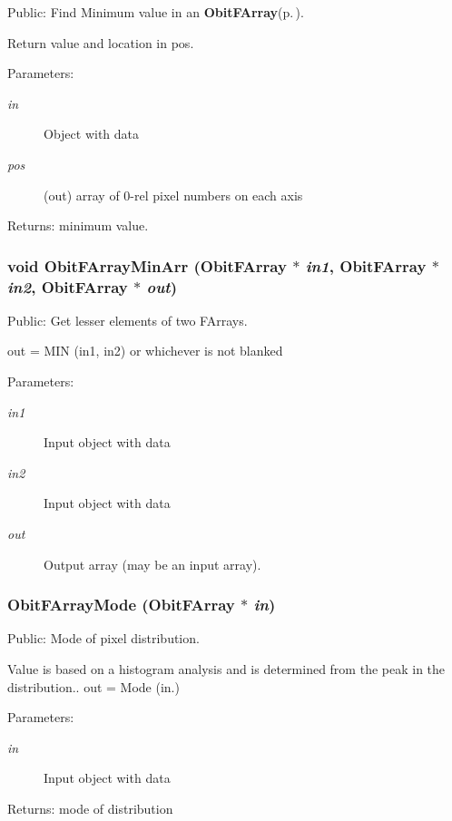 Public: Find Minimum value in an {\bf Obit\-FArray}{\rm (p.\,\pageref{structObitFArray})}. 

Return value and location in pos. \begin{Desc}
\item[Parameters:]
\begin{description}
\item[{\em in}]Object with data \item[{\em pos}](out) array of 0-rel pixel numbers on each axis \end{description}
\end{Desc}
\begin{Desc}
\item[Returns:]minimum value. \end{Desc}
\subsubsection{\setlength{\rightskip}{0pt plus 5cm}void Obit\-FArray\-Min\-Arr ({\bf Obit\-FArray} $\ast$ {\em in1}, {\bf Obit\-FArray} $\ast$ {\em in2}, {\bf Obit\-FArray} $\ast$ {\em out})}\label{ObitFArray_8h_a90}


Public: Get lesser elements of two FArrays. 

out = MIN (in1, in2) or whichever is not blanked \begin{Desc}
\item[Parameters:]
\begin{description}
\item[{\em in1}]Input object with data \item[{\em in2}]Input object with data \item[{\em out}]Output array (may be an input array). \end{description}
\end{Desc}
\subsubsection{ Obit\-FArray\-Mode ({\bf Obit\-FArray} $\ast$ {\em in})}\label{ObitFArray_8h_a74}


Public: Mode of pixel distribution. 

Value is based on a histogram analysis and is determined from the peak in the distribution.. out = Mode (in.) \begin{Desc}
\item[Parameters:]
\begin{description}
\item[{\em in}]Input object with data \end{description}
\end{Desc}
\begin{Desc}
\item[Returns:]mode of distribution \end{Desc}
